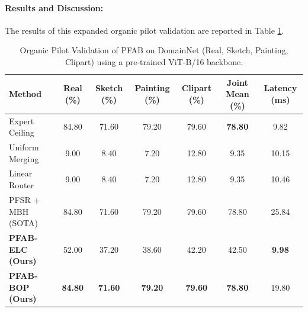 \paragraph{Results and Discussion:}
The results of this expanded organic pilot validation are reported in Table \ref{tab:organic_pilot}.
\begin{table}[t]
  \caption{Organic Pilot Validation of \textsc{PFAB} on DomainNet (Real, Sketch, Painting, Clipart) using a pre-trained ViT-B/16 backbone.}
  \label{tab:organic_pilot}
  \vskip 0.15in
  \begin{center}
  \begin{small}
  \begin{sc}
  \begin{tabular}{lcccccc}
    \toprule
    Method & Real (\%) & Sketch (\%) & Painting (\%) & Clipart (\%) & Joint Mean (\%) & Latency (ms) \\
    \midrule
    Expert Ceiling & 84.80 & 71.60 & 79.20 & 79.60 & \textbf{78.80} & 9.82 \\
    Uniform Merging & 9.00 & 8.40 & 7.20 & 12.80 & 9.35 & 10.15 \\
    Linear Router & 9.00 & 8.40 & 7.20 & 12.80 & 9.35 & 10.46 \\
    PFSR + MBH (SOTA) & 84.80 & 71.60 & 79.20 & 79.60 & 78.80 & 25.84 \\
    \midrule
    \textbf{PFAB-ELC (Ours)} & 52.00 & 37.20 & 38.60 & 42.20 & 42.50 & \textbf{9.98} \\
    \textbf{PFAB-BOP (Ours)} & \textbf{84.80} & \textbf{71.60} & \textbf{79.20} & \textbf{79.60} & \textbf{78.80} & 19.80 \\
    \bottomrule
  \end{tabular}
  \end{sc}
  \end{small}
  \end{center}
\end{table}

